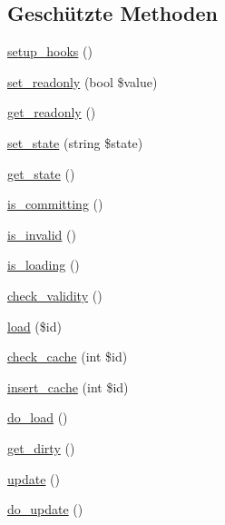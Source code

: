 \subsection*{Geschützte Methoden}
\begin{DoxyCompactItemize}
\item 
\hyperlink{classSunhill_1_1propertieshaving_ae137cde5881143c026d63cc1aa74a7d9}{setup\+\_\+hooks} ()
\item 
\hyperlink{classSunhill_1_1propertieshaving_a05ababb715192b01d2252929ac63e2c8}{set\+\_\+readonly} (bool \$value)
\item 
\hyperlink{classSunhill_1_1propertieshaving_af24837011f4842790e4c3af28b000893}{get\+\_\+readonly} ()
\item 
\hyperlink{classSunhill_1_1propertieshaving_afb86bddb0fd27bca057f1b2e1e69f1bb}{set\+\_\+state} (string \$state)
\item 
\hyperlink{classSunhill_1_1propertieshaving_a1fef9c7f754065855f78b3c08a42c20c}{get\+\_\+state} ()
\item 
\hyperlink{classSunhill_1_1propertieshaving_a09214596488db158e1dceef8fd6c56ce}{is\+\_\+committing} ()
\item 
\hyperlink{classSunhill_1_1propertieshaving_a7c93e4f535c219740c2c28739d063a7b}{is\+\_\+invalid} ()
\item 
\hyperlink{classSunhill_1_1propertieshaving_a44d5bf032c51fc588a74aa1041ea2c3e}{is\+\_\+loading} ()
\item 
\hyperlink{classSunhill_1_1propertieshaving_a16efcd791148d14b9939adeb4f5bb46f}{check\+\_\+validity} ()
\item 
\hyperlink{classSunhill_1_1propertieshaving_a44f6fba3f525b0b7b8f13610b4691394}{load} (\$id)
\item 
\hyperlink{classSunhill_1_1propertieshaving_a1a42ae798e683e08cb3e5692f651f25e}{check\+\_\+cache} (int \$id)
\item 
\hyperlink{classSunhill_1_1propertieshaving_af5e8a79f6f2fa994fe11ec6ece8b228d}{insert\+\_\+cache} (int \$id)
\item 
\hyperlink{classSunhill_1_1propertieshaving_a943acf0f49aee30c99f72c8b882a44fe}{do\+\_\+load} ()
\item 
\hyperlink{classSunhill_1_1propertieshaving_a63ce336134dcf334d80425651ee3734f}{get\+\_\+dirty} ()
\item 
\hyperlink{classSunhill_1_1propertieshaving_a643deda0fc26a8644ef3ab96080e2bcd}{update} ()
\item 
\hyperlink{classSunhill_1_1propertieshaving_a5e07d83fe49a5a204ca1f17182ca0a7e}{do\+\_\+update} ()

\end{DoxyCompactItemize}
